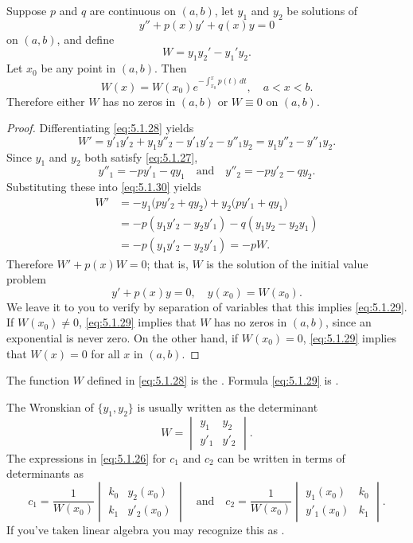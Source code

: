 \begin{theorem}\label{thmtype:5.1.4}
Suppose $p$ and $q$ are continuous on $(a,b)$, let $y_1$ and
$y_2$ be solutions of
\begin{equation}\label{eq:5.1.27}
y''+p(x)y'+q(x)y=0
\end{equation}
on $(a,b)$, and define
\begin{equation}\label{eq:5.1.28}
W=y_1y_2'-y_1'y_2.
\end{equation}
Let  $x_0$ be any point in $(a,b)$. Then
\begin{equation} \label{eq:5.1.29}
W(x)=W(x_0) e^{-\int^x_{x_0}p(t)\,
dt}, \quad a<x<b.
\end{equation}
Therefore  either $W$ has no zeros in  $(a,b)$ or $W\equiv0$
on  $(a,b)$.
\end{theorem}



\begin{proof}
Differentiating \eqref{eq:5.1.28} yields
\begin{equation}\label{eq:5.1.30}
W'=y'_1y'_2+y_1y''_2-y'_1y'_2-y''_1y_2=
y_1y''_2-y''_1y_2.
\end{equation}
 Since $y_1$ and $y_2$ both satisfy \eqref{eq:5.1.27},
\[
y''_1 =-py'_1-qy_1\quad\text{and}\quad
y''_2 =-py'_2-qy_2.
\]
Substituting these into \eqref{eq:5.1.30} yields
\begin{align*}
W'&= -y_1\bigl(py'_2+qy_2\bigr)
+y_2\bigl(py'_1+qy_1\bigr) \\
&= -p(y_1y'_2-y_2y'_1)-q(y_1y_2-y_2y_1)\\
&= -p(y_1y'_2-y_2y'_1)=-pW.
\end{align*}
Therefore $W'+p(x)W=0$;
that is, $W$ is the solution of the initial value problem
\[
y'+p(x)y=0,\quad y(x_0)=W(x_0).
\]
We leave it to you to verify by separation of variables that this
implies \eqref{eq:5.1.29}. If $W(x_0)\ne0$, \eqref{eq:5.1.29} implies
that
$W$ has no zeros in $(a,b)$, since an exponential is never zero. On
the other hand, if $W(x_0)=0$,  \eqref{eq:5.1.29} implies that $W(x)=0$
for all $x$ in $(a,b)$.
\end{proof}

The function $W$ defined in \eqref{eq:5.1.28} is  the
.
Formula \eqref{eq:5.1.29} is
.

The Wronskian of  $\{y_1,y_2\}$ is usually written as the determinant
\[
W=\begin{vmatrix}
y_1 & y_2 \\
y'_1 & y'_2
\end{vmatrix}.
\]
 The expressions in \eqref{eq:5.1.26} for $c_1$ and $c_2$ can
be written in terms of determinants as
\[
c_1=\frac{1}{W(x_0)}
\begin{vmatrix}
k_0 & y_2(x_0) \\
k_1 & y'_2(x_0)
\end{vmatrix}
\quad\text{and}\quad
c_2=\frac{1}{W(x_0)}
\begin{vmatrix}
y_1(x_0) & k_0 \\
y'_1(x_0) &k_1
\end{vmatrix}.
\]
If you've taken linear algebra you may recognize this as
.

